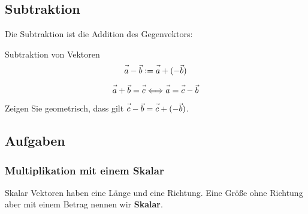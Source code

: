 

\newpage


\subsection{Subtraktion}

Die Subtraktion ist die Addition des Gegenvektors:

\begin{definition}{Subtraktion von Vektoren}{}
  $$\vec{a\vphantom{b}} - \vec{b} := \vec{a\vphantom{b}} + (-\vec{b})$$
\end{definition}

\begin{bemerkung}{}{}
  $$\vec{a\vphantom{b}} + \vec{b} = \vec{c\vphantom{b}} \Longleftrightarrow \vec{a\vphantom{b}} = \vec{c\vphantom{b}} - \vec{b}$$
\end{bemerkung}

Zeigen Sie geometrisch, dass gilt $\vec{c\vphantom{b}} - \vec{b} = \vec{c\vphantom{b}} +
(-\vec{b})$.


\subsection*{Aufgaben}
\newpage


\subsubsection{Multiplikation mit einem Skalar}
\begin{definition}{Skalar}{}
  Vektoren haben eine Länge und eine Richtung. Eine Größe ohne
  Richtung aber mit einem Betrag nennen wir \textbf{Skalar}. 
\end{definition}

